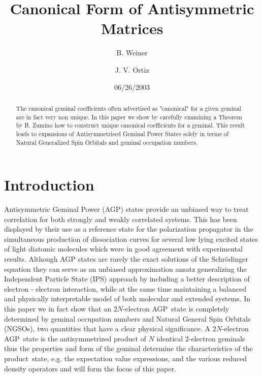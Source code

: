 \documentclass[aps,preprint]{revtex4}%
\begin{document}
\preprint{ }
\title[Antisym. Mat]{Canonical Form of Antisymmetric Matrices}
\author{B. Weiner}
\author{J. V. Ortiz}
\pacs{}

\begin{abstract}
The canonical geminal coefficients often advertised as "canonical" for a given
geminal are in fact very non unique. In this paper we show by carefully
examining a Theorem by B. Zumino how to construct unique canonical
coefficients for a geminal. This result leads to expansions of Antisymmetrised
Geminal Power States solely in terms of Natural Generalized Spin Orbitals and
geminal occupation numbers.

\end{abstract}
\date{06/26/2003}
\maketitle
\tableofcontents


\section{Introduction\label{intro}}

Antisymmetric Geminal Power (AGP) states provide an unbiased way to treat
correlation for both strongly and weakly correlated systems. This has been
displayed by their use as a reference state for the polarization propagator
\cite{weiner87}\cite{Weiner85}\cite{Weiner84a}\cite{Kurtz83}\cite{Jorgen83} in
the simultaneous production of dissociation curves for several low lying
excited states of light diatomic molecules which were in good agreement with
experimental results. Although AGP states are rarely the exact solutions of
the Schr\"{o}dinger equation they can serve as an unbiased approximation
ansatz generalizing the Independent Particle State (IPS) approach by including
a better description of electron - electron interaction, while at the same
time maintaining a balanced and physically interpretable model of both
molecular and extended systems. In this paper we in fact show that an
$2N$-electron AGP\ state is completely determined by geminal occupation
numbers and Natural General Spin Orbitals (NGSOs), two quantities that have a
clear physical significance. A $2N$-electron AGP\ state is the antisymmetrized
product of $N$ identical $2$-electron geminals thus the properties and form of
the geminal determine the characteristics of the product\ state, e.g. the
expectation value expressions, and the various reduced density operators and
will form the focus of this paper.
\end{document}
